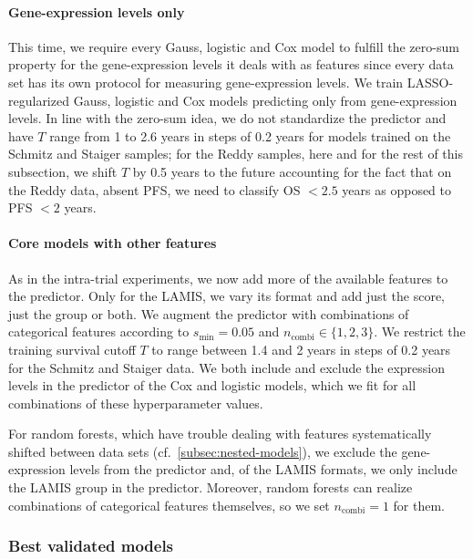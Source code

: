 \paragraph{Gene-expression levels only}
This time, we require every Gauss, logistic and Cox model to fulfill the zero-sum property for 
the gene-expression levels it deals with as features since every data set has its own protocol for 
measuring gene-expression levels. We train LASSO-regularized Gauss, 
logistic and Cox models predicting only from gene-expression levels. In line with the zero-sum 
idea, we do not standardize the predictor and have $T$ range from \num{1} to \num{2.6} years in 
steps of \num{0.2} years for models trained on the Schmitz and Staiger samples; for the Reddy 
samples, here and for the rest of this subsection, we shift $T$ by
\num{0.5} years to the future accounting for the fact that on the Reddy data, absent PFS, we need 
to classify OS $< \num{2.5}$ years as opposed to PFS $< \num{2}$ years.

\paragraph{Core models with other features}
As in the intra-trial experiments, we now add more of the available features to the predictor. Only 
for the LAMIS, we vary its format and add just the score, just the group or both. We augment the 
predictor with combinations of categorical features according to $s_\text{min} = \num{0.05}$ and 
$n_\text{combi} \in \{ 1, 2, 3 \}$. We restrict the training survival cutoff $T$ to range between 
\num{1.4} and \num{2} years in steps of \num{0.2} years for the Schmitz and Staiger data. We 
both include and exclude the expression levels in the predictor of the Cox and logistic 
models, which we fit for all combinations of these hyperparameter values.

For random forests, which have trouble dealing with features systematically shifted between data 
sets (cf.\ \ref{subsec:nested-models}), we exclude the gene-expression levels from the predictor 
and, of the LAMIS formats, we only include the LAMIS group in the predictor. Moreover, random 
forests can realize combinations of categorical features themselves, so we set $n_\text{combi} = 1$ 
for them.

\subsubsection{Best validated models}

